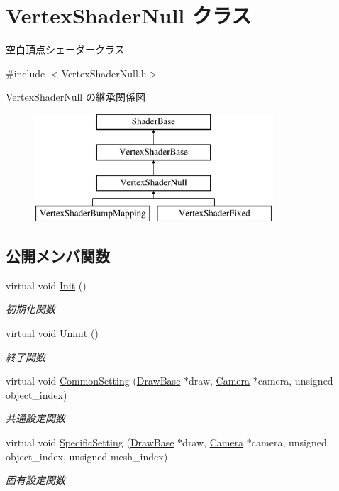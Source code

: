 \hypertarget{class_vertex_shader_null}{}\section{Vertex\+Shader\+Null クラス}
\label{class_vertex_shader_null}


空白頂点シェーダークラス  




{\ttfamily \#include $<$Vertex\+Shader\+Null.\+h$>$}

Vertex\+Shader\+Null の継承関係図\begin{figure}[H]
\begin{center}
\leavevmode
\includegraphics[height=4.000000cm]{class_vertex_shader_null}
\end{center}
\end{figure}
\subsection*{公開メンバ関数}
\begin{DoxyCompactItemize}
\item 
virtual void \mbox{\hyperlink{class_vertex_shader_null_af30eb8057fe0537bc6ade214647b6fb5}{Init}} ()
\begin{DoxyCompactList}\small\item\em 初期化関数 \end{DoxyCompactList}\item 
virtual void \mbox{\hyperlink{class_vertex_shader_null_a16334df4ac02db3dd63f042622032301}{Uninit}} ()
\begin{DoxyCompactList}\small\item\em 終了関数 \end{DoxyCompactList}\item 
virtual void \mbox{\hyperlink{class_vertex_shader_null_a95f1a66045fb39c42cf0566f1990b6a1}{Common\+Setting}} (\mbox{\hyperlink{class_draw_base}{Draw\+Base}} $\ast$draw, \mbox{\hyperlink{class_camera}{Camera}} $\ast$camera, unsigned object\+\_\+index)
\begin{DoxyCompactList}\small\item\em 共通設定関数 \end{DoxyCompactList}\item 
virtual void \mbox{\hyperlink{class_vertex_shader_null_aa2234c6ea083e3c0233d59f222145992}{Specific\+Setting}} (\mbox{\hyperlink{class_draw_base}{Draw\+Base}} $\ast$draw, \mbox{\hyperlink{class_camera}{Camera}} $\ast$camera, unsigned object\+\_\+index, unsigned mesh\+\_\+index)
\begin{DoxyCompactList}\small\item\em 固有設定関数 \end{DoxyCompactList}\end{DoxyCompactItemize}


